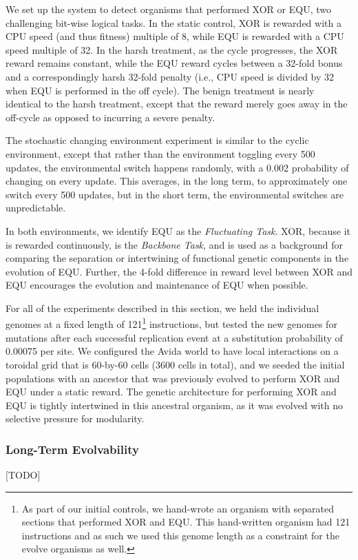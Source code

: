 \documentclass[10pt,letterpaper]{article}
\begin{document}
We set up the system to detect organisms that performed XOR or EQU, two challenging bit-wise logical tasks.
In the static control, XOR is rewarded with a CPU speed (and thus fitness) multiple of 8, while EQU is rewarded with a CPU speed multiple of 32. In the harsh treatment, as the cycle progresses, the XOR reward remains constant, while the EQU reward cycles between a 32-fold bonus and a correspondingly harsh 32-fold penalty (i.e., CPU speed is divided by 32 when EQU is performed in the off cycle). The benign treatment is nearly identical to the harsh treatment, except that the reward merely goes away in the off-cycle as opposed to incurring a severe penalty.

The stochastic changing environment experiment is similar to the cyclic environment, except that rather than the environment toggling every 500 updates, the environmental switch happens randomly, with a 0.002
probability of changing on every update. This averages, in the long term, to approximately one switch every 500 updates, but in the short term, the environmental switches are unpredictable.

In both environments, we identify EQU as the \textit{Fluctuating Task}. XOR, because it is rewarded continuously, is the \textit{Backbone Task}, and is used as a background for comparing the separation or intertwining of functional genetic components in the evolution of EQU. Further, the 4-fold difference in reward level between XOR and EQU encourages the evolution and maintenance of EQU when possible.

For all of the experiments described in this section, we held the individual genomes at a fixed length of 121\footnote{As part of our initial controls, we hand-wrote an organism with separated sections that performed XOR and EQU. This hand-written organism had 121 instructions and as such we used this genome length as a constraint for the evolve organisms as well.} instructions, but tested the new genomes for mutations after each successful replication event at a substitution probability of 0.00075 per site. We configured the Avida world to have local interactions on a toroidal grid that is 60-by-60 cells (3600 cells in total), and we seeded the initial populations with an ancestor that was previously evolved to perform XOR and EQU under a static reward.
The genetic architecture for performing XOR and EQU is tightly intertwined in this ancestral organism, as it was evolved with no selective pressure for modularity.

\subsubsection*{Long-Term Evolvability}
[\@RCK TODO]
\end{document}
